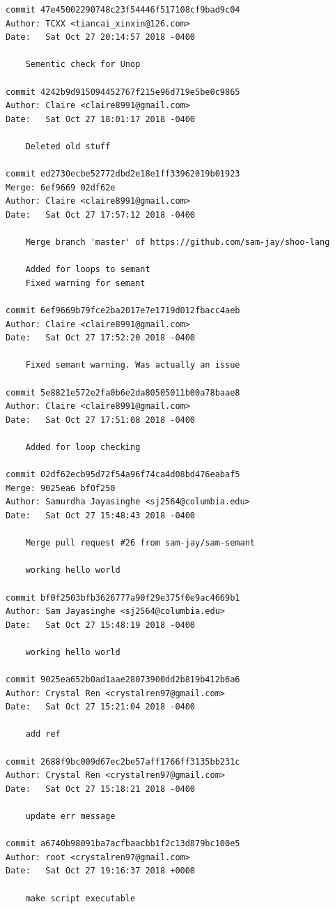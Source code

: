 \documentclass[12pt]{article}
\begin{document}
\begin{lstlisting}
commit 47e45002290748c23f54446f517108cf9bad9c04
Author: TCXX <tiancai_xinxin@126.com>
Date:   Sat Oct 27 20:14:57 2018 -0400

    Sementic check for Unop

commit 4242b9d915094452767f215e96d719e5be0c9865
Author: Claire <claire8991@gmail.com>
Date:   Sat Oct 27 18:01:17 2018 -0400

    Deleted old stuff

commit ed2730ecbe52772dbd2e18e1ff33962019b01923
Merge: 6ef9669 02df62e
Author: Claire <claire8991@gmail.com>
Date:   Sat Oct 27 17:57:12 2018 -0400

    Merge branch 'master' of https://github.com/sam-jay/shoo-lang
    
    Added for loops to semant
    Fixed warning for semant

commit 6ef9669b79fce2ba2017e7e1719d012fbacc4aeb
Author: Claire <claire8991@gmail.com>
Date:   Sat Oct 27 17:52:20 2018 -0400

    Fixed semant warning. Was actually an issue

commit 5e8821e572e2fa0b6e2da80505011b00a78baae8
Author: Claire <claire8991@gmail.com>
Date:   Sat Oct 27 17:51:08 2018 -0400

    Added for loop checking

commit 02df62ecb95d72f54a96f74ca4d08bd476eabaf5
Merge: 9025ea6 bf0f250
Author: Samurdha Jayasinghe <sj2564@columbia.edu>
Date:   Sat Oct 27 15:48:43 2018 -0400

    Merge pull request #26 from sam-jay/sam-semant
    
    working hello world

commit bf0f2503bfb3626777a90f29e375f0e9ac4669b1
Author: Sam Jayasinghe <sj2564@columbia.edu>
Date:   Sat Oct 27 15:48:19 2018 -0400

    working hello world

commit 9025ea652b0ad1aae28073900dd2b819b412b6a6
Author: Crystal Ren <crystalren97@gmail.com>
Date:   Sat Oct 27 15:21:04 2018 -0400

    add ref

commit 2688f9bc009d67ec2be57aff1766ff3135bb231c
Author: Crystal Ren <crystalren97@gmail.com>
Date:   Sat Oct 27 15:18:21 2018 -0400

    update err message

commit a6740b98091ba7acfbaacbb1f2c13d879bc100e5
Author: root <crystalren97@gmail.com>
Date:   Sat Oct 27 19:16:37 2018 +0000

    make script executable


\end{lstlisting}
\end{document}
